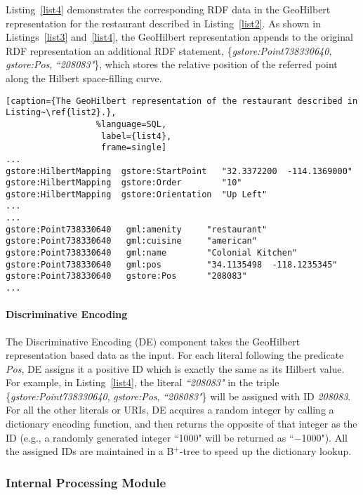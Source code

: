 Listing~\ref{list4} demonstrates the corresponding RDF data in the
GeoHilbert representation for the restaurant described in
Listing~\ref{list2}. As shown in Listings~\ref{list3}
and~\ref{list4}, the GeoHilbert representation appends to the
original RDF representation an additional RDF statement,
\{\emph{gstore:Point738330640}, \emph{gstore:Pos},
\emph{``208083"}\}, which stores the relative position of the
referred point along the Hilbert space-filling curve.


\begin{lstlisting}[caption={The GeoHilbert representation of the restaurant described in Listing~\ref{list2}.},
                  %language=SQL,
                   label={list4},
                   frame=single]
...
gstore:HilbertMapping  gstore:StartPoint   "32.3372200  -114.1369000"
gstore:HilbertMapping  gstore:Order        "10"
gstore:HilbertMapping  gstore:Orientation  "Up Left"
...
...
gstore:Point738330640   gml:amenity     "restaurant"
gstore:Point738330640   gml:cuisine     "american"
gstore:Point738330640   gml:name        "Colonial Kitchen"
gstore:Point738330640   gml:pos         "34.1135498  -118.1235345"
gstore:Point738330640   gstore:Pos      "208083"
...
\end{lstlisting}


\paragraph{Discriminative Encoding}

The Discriminative Encoding (DE) component takes the GeoHilbert
representation based data as the input. For each literal following
the predicate \emph{Pos}, DE assigns it a positive ID which is
exactly the same as its Hilbert value. For example, in
Listing~\ref{list4}, the literal \emph{``208083"} in the triple
\{\emph{gstore:Point738330640}, \emph{gstore:Pos},
\emph{``208083"}\} will be assigned with ID \emph{208083}. For all
the other literals or URIs, DE acquires a random integer by
calling a dictionary encoding function, and then returns the
opposite of that integer as the ID (e.g., a randomly generated
integer ``1000" will be returned as ``$-$1000"). All the assigned
IDs are maintained in a B$^{+}$-tree to speed up the dictionary
lookup.


\subsubsection{Internal Processing Module}

